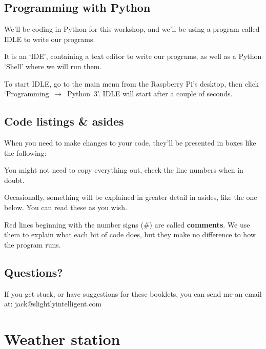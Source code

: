 \documentclass[a4paper, twocolumn, twoside, 12pt]{article}
\newenvironment{aside}
		{
		\begin{mdframed}[
			style=0,%
			leftline=false,
			rightline=false,
			innerbottommargin=2pt,
			innerleftmargin=12pt,
			innerrightmargin=0pt,
			linewidth=0.75pt,
			skipabove=6pt,
			skipbelow=6pt
			]
				\small
				\color{JungleGreen}
				\setlength{\parskip}{2pt}
				\vspace{2pt} %
		}
		{
		\end{mdframed}
		}
\begin{document}
	\subsection*{Programming with Python}
	
	We'll be coding in Python for this workshop, and we'll be using a program called IDLE to write our programs.
	
	It is an `IDE', containing a text editor to write our programs, as well as a Python `Shell' where we will run them.
	
	To start IDLE\label{IDLE}, go to the main menu from the Raspberry Pi's desktop, then click \mbox{`Programming $\rightarrow$ Python 3'}. IDLE will start after a couple of seconds.
	
	\subsection*{Code listings \& asides}
	
		When you need to make changes to your code, they'll be presented in boxes like the following:

		
	
		You might not need to copy everything out, check the line numbers when in doubt.
	
		Occasionally, something will be explained in greater detail in asides, like the one below. You can read these as you wish.
	
		\begin{aside}
			Red lines beginning with the number signs (\#) are called \textbf{comments}.
			We use them to explain what each bit of code does, but they make no difference to how the program runs.
		\end{aside}
		
	\subsection*{Questions?}
	
		If you get stuck, or have suggestions for these booklets, you can send me an email at:
		\newline \color{WildStrawberry}jack@slightlyintelligent.com\color{Black}\label{email}
	
	\section{Weather station}
	
\end{document}
